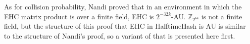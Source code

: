 \documentclass[sigconf, nonacm]{acmart}
\newcommand{\ints}{\mathbb{Z}}
\begin{document}





As for collision probability, Nandi proved that in an environment in which the EHC matrix product is over a finite field, EHC is $2^{-32k}$-AU.
$\ints_{2^{64}}$ is not a finite field, but the structure of this proof that EHC in HalftimeHash is AU is similar to the structure of Nandi's proof, so a variant of that is presented here first.  \cite{ehc-nandi}
\end{document}
